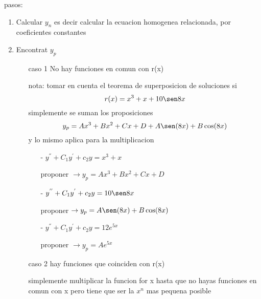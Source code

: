 pasos:
\begin{enumerate}
	\item Calcular $y_n$ es decir
		calcular la ecuacion homogenea relacionada, por coeficientes constantes
		
	\item Encontrat $y_p$
		\begin{enumerate}
			\item[caso 1] No hay funciones en comun con r(x)

				nota: tomar en cuenta el teorema de superposicion de soluciones
				si $$r(x) = x^3 + x +  10 \sen 8x$$
				simplemente se suman los proposiciones
				 $$y_p = Ax^3 + Bx^2 + Cx + D +  A \sen (8x) + B \cos (8x) $$
				 y lo mismo aplica para la multiplicacion

				\begin{enumerate}
					\item[-] $y^{''} + C_1y^{'} + c_2y = x^3 + x$

						proponer $\rightarrow y_p = Ax^3 + Bx^2 + Cx + D$
					\item[-] $y^{''} + C_1y^{'} + c_2y = 10 \sen 8x$

						proponer $\rightarrow y_p = A \sen (8x) + B \cos (8x) $
					\item[-] $y^{''} + C_1y^{'} + c_2y = 12 e^{5x} $

						proponer $\rightarrow y_p = Ae^{5x}$
				\end{enumerate}
			\item[caso 2] hay funciones que coinciden con r(x)

				simplemente multiplicar la funcion for x hasta que no hayas funciones en comun con x
				pero tiene que ser la $x^n$ mas pequena posible
		\end{enumerate}

\end{enumerate}
